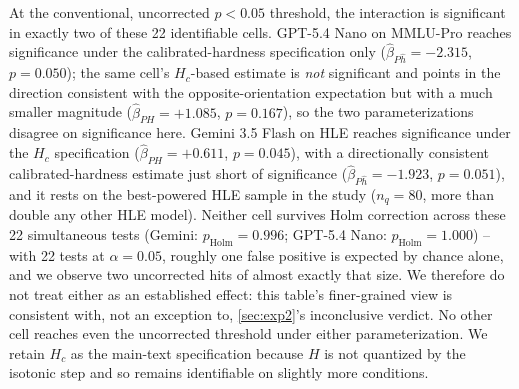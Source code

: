 At the conventional, uncorrected $p<0.05$ threshold, the interaction is significant in exactly two of these 22 identifiable cells. GPT-5.4 Nano on MMLU-Pro reaches significance under the calibrated-hardness specification only ($\hat\beta_{P\hat h}=-2.315$, $p=0.050$); the same cell's $H_c$-based estimate is \emph{not} significant and points in the direction consistent with the opposite-orientation expectation but with a much smaller magnitude ($\hat\beta_{PH}=+1.085$, $p=0.167$), so the two parameterizations disagree on significance here. Gemini 3.5 Flash on HLE reaches significance under the $H_c$ specification ($\hat\beta_{PH}=+0.611$, $p=0.045$), with a directionally consistent calibrated-hardness estimate just short of significance ($\hat\beta_{P\hat h}=-1.923$, $p=0.051$), and it rests on the best-powered HLE sample in the study ($n_q=80$, more than double any other HLE model). Neither cell survives Holm correction across these 22 simultaneous tests (Gemini: $p_{\text{Holm}}=0.996$; GPT-5.4 Nano: $p_{\text{Holm}}=1.000$) -- with 22 tests at $\alpha=0.05$, roughly one false positive is expected by chance alone, and we observe two uncorrected hits of almost exactly that size. We therefore do not treat either as an established effect: this table's finer-grained view is consistent with, not an exception to, \autoref{sec:exp2}'s inconclusive verdict. No other cell reaches even the uncorrected threshold under either parameterization. We retain $H_c$ as the main-text specification because $H$ is not quantized by the isotonic step and so remains identifiable on slightly more conditions.



